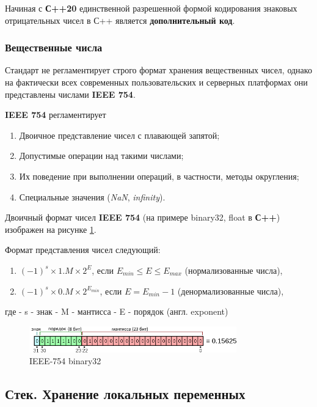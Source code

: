 Начиная с \textbf{С++20} единственной разрешенной формой кодирования
знаковых отрицательных чисел в С++ является \textbf{дополнительный код}.

\subsubsection{Вещественные числа}

Стандарт не регламентирует строго формат хранения вещественных чисел,
однако на фактически всех современных пользовательских и серверных
платформах они представлены числами \textbf{IEEE 754}.

\textbf{IEEE 754} регламентирует
\begin{enumerate}
  \item Двоичное представление чисел с плавающей запятой;
  \item Допустимые операции над такими числами;
  \item Их поведение при выполнении операций, в частности, методы округления;
  \item Специальные значения (\emph{NaN}, \emph{infinity}).
\end{enumerate}

Двоичный формат чисел \textbf{IEEE 754} (на примере binary32, float в \textbf{С++})
изображен на рисунке \ref{fig:ieee754float}.

Формат представления чисел следующий:
\begin{enumerate}
   \item \((-1)^s \times 1.M \times 2^E\), если \(E_{min} \le E \le E_{max}\) (нормализованные числа),
   \item \((-1)^s \times 0.M \times 2^{E_{min}}\), если \(E=E_{min}-1\) (денормализованные числа),
\end{enumerate}
где - s - знак - M - мантисса - E - порядок (англ. exponent)

\begin{figure}[h]
  \centering
  \includegraphics[width=0.8\textwidth]{./res/ieee-binary32.png}
  \caption{IEEE-754 binary32}
  \label{fig:ieee754float}
\end{figure}

\subsection{Стек. Хранение локальных переменных}

